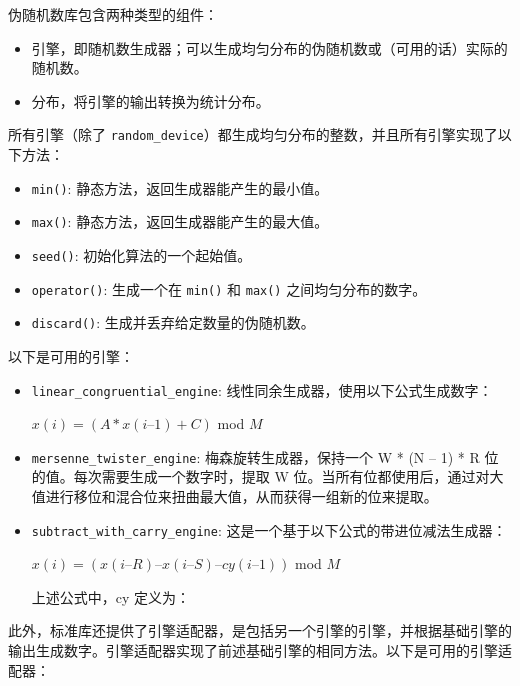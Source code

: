 
伪随机数库包含两种类型的组件：

\begin{itemize}
\item
引擎，即随机数生成器；可以生成均匀分布的伪随机数或（可用的话）实际的随机数。

\item
分布，将引擎的输出转换为统计分布。
\end{itemize}

所有引擎（除了 \verb|random_device|）都生成均匀分布的整数，并且所有引擎实现了以下方法：

\begin{itemize}
\item
\verb|min()|: 静态方法，返回生成器能产生的最小值。

\item
\verb|max()|: 静态方法，返回生成器能产生的最大值。

\item
\verb|seed()|: 初始化算法的一个起始值。

\item
\verb|operator()|: 生成一个在 \verb|min()| 和 \verb|max()| 之间均匀分布的数字。

\item
\verb|discard()|: 生成并丢弃给定数量的伪随机数。
\end{itemize}

以下是可用的引擎：

\begin{itemize}
\item
\verb|linear_congruential_engine|: 线性同余生成器，使用以下公式生成数字：

$x(i) = (A * x(i – 1) + C)$ mod $M$

\item
\verb|mersenne_twister_engine|: 梅森旋转生成器，保持一个 W * (N – 1) * R 位的值。每次需要生成一个数字时，提取 W 位。当所有位都使用后，通过对大值进行移位和混合位来扭曲最大值，从而获得一组新的位来提取。

\item
\verb|subtract_with_carry_engine|: 这是一个基于以下公式的带进位减法生成器：

$x(i) = (x(i – R) – x(i – S) – cy(i – 1))$ mod $M$

上述公式中，cy 定义为：

\end{itemize}

此外，标准库还提供了引擎适配器，是包括另一个引擎的引擎，并根据基础引擎的输出生成数字。引擎适配器实现了前述基础引擎的相同方法。以下是可用的引擎适配器：

